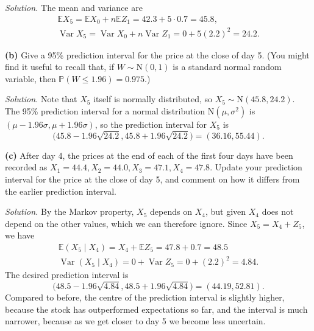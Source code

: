 \documentclass[
  a4paper,
]{article}
\theoremstyle{definition}
\theoremstyle{definition}
\theoremstyle{definition}
\theoremstyle{remark}
\begin{document}
\begin{myanswers}
\emph{Solution.} The mean and variance are
\begin{gather*}
  \mathbb EX_5 = \mathbb E X_0 + n \mathbb E Z_1 = 42.3 + 5 \cdot 0.7 = 45.8 , \\
  \operatorname{Var}X_5 = \operatorname{Var}X_0 + n \operatorname{Var}Z_1 = 0 + 5 (2.2)^2 = 24.2 .
  \end{gather*}

\end{myanswers}

\textbf{(b)} Give a 95\% prediction interval for the price at the close of day 5. (You might find it useful to recall that, if \(W \sim \text{N}(0,1)\) is a standard normal random variable, then \(\mathbb P(W \leq 1.96) = 0.975\).)

\begin{myanswers}
\emph{Solution.} Note that \(X_5\) itself is normally distributed, so \(X_5 \sim \text{N}(45.8,24.2)\). The 95\% prediction interval for a normal distribution \(\text{N}(\mu, \sigma^2)\) is \((\mu - 1.96\sigma, \mu + 1.96\sigma)\), so the prediction interval for \(X_5\) is
\[ \big(45.8 - 1.96\sqrt{24.2},  45.8 + 1.96\sqrt{24.2}\big) = (36.16, 55.44) . \]

\end{myanswers}

\textbf{(c)} After day 4, the prices at the end of each of the first four days have been recorded as \(X_1 = 44.4, X_2 = 44.0, X_3 = 47.1, X_4 = 47.8\). Update your prediction interval for the price at the close of day 5, and comment on how it differs from the earlier prediction interval.

\begin{myanswers}
\emph{Solution.} By the Markov property, \(X_5\) depends on \(X_4\), but given \(X_4\) does not depend on the other values, which we can therefore ignore. Since \(X_5 = X_4 + Z_5\), we have
\begin{gather*}
  \mathbb E(X_5 \mid X_4) = X_4 + \mathbb E Z_5 = 47.8 + 0.7 = 48.5 \\
  \operatorname{Var}(X_5 \mid X_4) = 0 + \operatorname{Var}Z_5 = 0 + (2.2)^2 = 4.84.
  \end{gather*}
The desired prediction interval is
\[ \big(48.5 - 1.96\sqrt{4.84},  48.5+ 1.96\sqrt{4.84}\big) = (44.19, 52.81) . \]
Compared to before, the centre of the prediction interval is slightly higher, because the stock has outperformed expectations so far, and the interval is much narrower, because as we get closer to day 5 we become less uncertain.

\end{myanswers}
\end{document}
